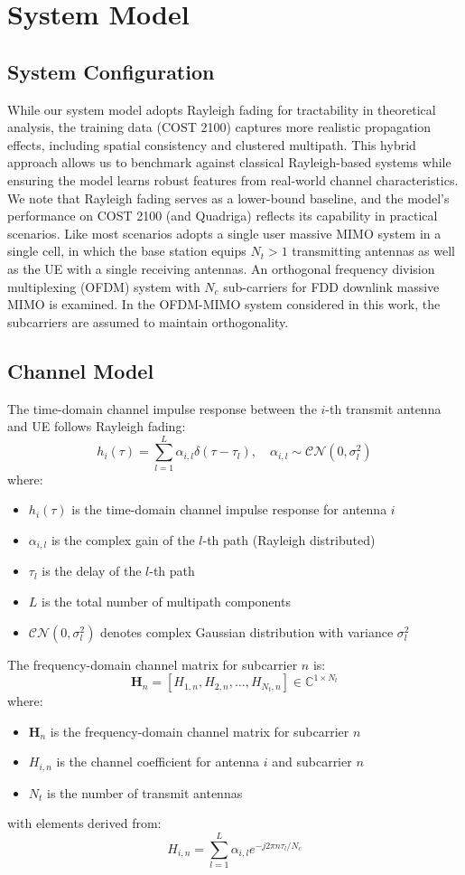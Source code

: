 \documentclass[lettersize,journal]{IEEEtran}
\begin{document}
\section{System Model}
\label{sec:system_model}

\subsection{System Configuration}
While our system model adopts Rayleigh fading for tractability in theoretical analysis, the training data (COST 2100) captures more realistic propagation effects, including spatial consistency and clustered multipath. This hybrid approach allows us to benchmark against classical Rayleigh-based systems while ensuring the model learns robust features from real-world channel characteristics. We note that Rayleigh fading serves as a lower-bound baseline, and the model’s performance on COST 2100 (and Quadriga) reflects its capability in practical scenarios.
Like most scenarios adopts a single user massive MIMO system in a single cell, in which the base station equips $N_{t} > 1$ transmitting antennas as well as the UE with a single receiving antennas. An orthogonal frequency division multiplexing (OFDM) system with $N_{c}$ sub-carriers for FDD downlink massive MIMO is examined. In the OFDM-MIMO system considered in this work, the subcarriers are assumed to maintain orthogonality.

\subsection{Channel Model}
The time-domain channel impulse response between the $i$-th transmit antenna and UE follows Rayleigh fading:
\[
h_i(\tau) = \sum_{l=1}^L \alpha_{i,l} \delta(\tau-\tau_l), \quad \alpha_{i,l} \sim \mathcal{CN}(0,\sigma_l^2)
\]
where:
\begin{itemize}
    \item $h_i(\tau)$ is the time-domain channel impulse response for antenna $i$
    \item $\alpha_{i,l}$ is the complex gain of the $l$-th path (Rayleigh distributed)
    \item $\tau_l$ is the delay of the $l$-th path
    \item $L$ is the total number of multipath components
    \item $\mathcal{CN}(0,\sigma_l^2)$ denotes complex Gaussian distribution with variance $\sigma_l^2$
\end{itemize}
The frequency-domain channel matrix for subcarrier $n$ is:
\[
\mathbf{H}_n = \left[H_{1,n}, H_{2,n}, \dots, H_{N_t,n}\right] \in \mathbb{C}^{1 \times N_t}
\]
where:
\begin{itemize}
    \item $\mathbf{H}_n$ is the frequency-domain channel matrix for subcarrier $n$
    \item $H_{i,n}$ is the channel coefficient for antenna $i$ and subcarrier $n$
    \item $N_t$ is the number of transmit antennas
\end{itemize}
with elements derived from:
\[
H_{i,n} = \sum_{l=1}^L \alpha_{i,l} e^{-j2\pi n \tau_l/N_c}
\]
\end{document}
